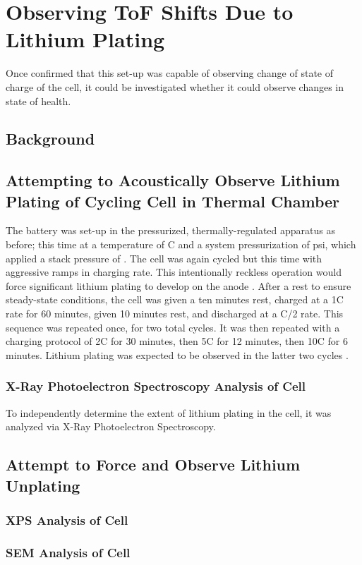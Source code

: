 \section{Observing ToF Shifts Due to Lithium Plating} 
Once confirmed that this set-up was capable of observing change of state of charge of the cell, it could be investigated whether it could observe changes in state of health.

\subsection{Background}

\subsection{Attempting to Acoustically Observe Lithium Plating of Cycling Cell in Thermal Chamber}
The battery was set-up in the pressurized, thermally-regulated apparatus as before; this time at a temperature of  C and a system pressurization of  psi, which applied a stack pressure of . The cell was again cycled but this time with aggressive ramps in charging rate. This intentionally reckless operation would force significant lithium plating to develop on the anode . After a rest to ensure steady-state conditions, the cell was given a ten minutes rest, charged at a 1C rate for 60 minutes, given 10 minutes rest, and discharged at a C/2 rate. This sequence was repeated once, for two total cycles. It was then repeated with a charging protocol of 2C for 30 minutes, then 5C for 12 minutes, then 10C for 6 minutes. Lithium plating was expected to be observed in the latter two cycles .
    
\subsubsection{X-Ray Photoelectron Spectroscopy Analysis of Cell}
    To independently determine the extent of lithium plating in the cell, it was analyzed via X-Ray Photoelectron Spectroscopy.

\subsection{Attempt to Force and Observe Lithium Unplating}

\subsubsection{XPS Analysis of Cell}

\subsubsection{SEM Analysis of Cell}